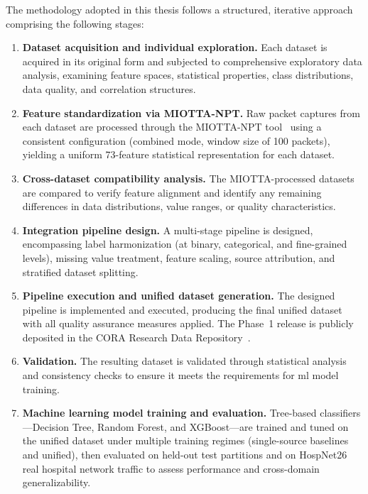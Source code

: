 The methodology adopted in this thesis follows a structured, iterative approach comprising the following stages:

\begin{enumerate}
    \item \textbf{Dataset acquisition and individual exploration.} Each dataset is acquired in its original form and subjected to comprehensive exploratory data analysis, examining feature spaces, statistical properties, class distributions, data quality, and correlation structures.

    \item \textbf{Feature standardization via MIOTTA-NPT.} Raw packet captures from each dataset are processed through the MIOTTA-NPT tool~\cite{leon2025miotta, miotta_npt_github} using a consistent configuration (combined mode, window size of 100 packets), yielding a uniform 73-feature statistical representation for each dataset.

    \item \textbf{Cross-dataset compatibility analysis.} The MIOTTA-processed datasets are compared to verify feature alignment and identify any remaining differences in data distributions, value ranges, or quality characteristics.

    \item \textbf{Integration pipeline design.} A multi-stage pipeline is designed, encompassing label harmonization (at binary, categorical, and fine-grained levels), missing value treatment, feature scaling, source attribution, and stratified dataset splitting.

    \item \textbf{Pipeline execution and unified dataset generation.} The designed pipeline is implemented and executed, producing the final unified dataset with all quality assurance measures applied. The Phase~1 release is publicly deposited in the CORA Research Data Repository~\cite{unified_iomt_csuc2026}.

    \item \textbf{Validation.} The resulting dataset is validated through statistical analysis and consistency checks to ensure it meets the requirements for \gls{ml} model training.

    \item \textbf{Machine learning model training and evaluation.} Tree-based classifiers---Decision Tree, Random Forest, and XGBoost---are trained and tuned on the unified dataset under multiple training regimes (single-source baselines and unified), then evaluated on held-out test partitions and on HospNet26 real hospital network traffic to assess performance and cross-domain generalizability.
\end{enumerate}

